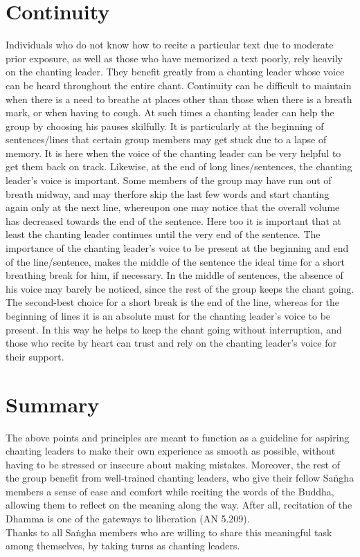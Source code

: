 \section{Continuity}
Individuals who do not know how to recite a particular text due to moderate prior exposure, as well as those who have memorized a text poorly, rely heavily on the chanting leader. They benefit greatly from a chanting leader whose voice can be heard throughout the entire chant. Continuity can be difficult to maintain when there is a need to breathe at places other than those when there is a breath mark, or when having to cough. At such times a chanting leader can help the group by choosing his pauses skilfully. It is particularly at the beginning of sentences/lines that certain group members may get stuck due to a lapse of memory. It is here when the voice of the chanting leader can be very helpful to get them back on track. Likewise, at the end of long lines/sentences, the chanting leader’s voice is important. Some members of the group may have run out of breath midway, and may therfore skip the last few words and start chanting again only at the next line, whereupon one may notice that the overall volume has decreased towards the end of the sentence. Here too it is important that at least the chanting leader continues until the very end of the sentence. The importance of the chanting leader’s voice to be present at the beginning and end of the line/sentence, makes the middle of the sentence the ideal time for a short breathing break for him, if necessary. In the middle of sentences, the absence of his voice may barely be noticed, since the rest of the group keeps the chant going. The second-best choice for a short break is the end of the line, whereas for the beginning of lines it is an absolute must for the chanting leader’s voice to be present. In this way he helps to keep the chant going without interruption, and those who recite by heart can trust and rely on the chanting leader’s voice for their support.\\

\section{Summary}
The above points and principles are meant to function as a guideline for aspiring chanting leaders to make their own experience as smooth as possible, without having to be stressed or insecure about making mistakes. Moreover, the rest of the group benefit from well-trained chanting leaders, who give their fellow Saṅgha members a sense of ease and comfort while reciting the words of the Buddha, allowing them to reflect on the meaning along the way. After all, recitation of the Dhamma is one of the gateways to liberation (AN 5.209).\\
Thanks to all Saṅgha members who are willing to share this meaningful task among themselves, by taking turns as chanting leaders.
